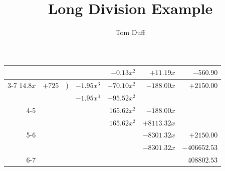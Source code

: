 \documentclass{article}
\title{Long Division Example}
\author{Tom Duff}
\theoremstyle{definition}
\begin{document}
\maketitle

\setlength{\tabcolsep}{0pt}
\begin{center} \begin{tabular}{rrrrrrr}
         &        &   &            &   $-0.13x^2$ &   $+11.19x$ &    $-560.90$ \\
                    \cline{3-7}
 $14.8x$ & $+725$ & ) & $-1.95x^3$ &  $+70.10x^2$ &  $-188.00x$ &   $+2150.00$ \\
         &        &   & $-1.95x^3$ &  $-95.52x^2$ &             &              \\
                        \cline{4-5}
         &        &   &            &  $165.62x^2$ &  $-188.00x$ &              \\
         &        &   &            &  $165.62x^2$ & $+8113.32x$ &              \\
                                      \cline{5-6}
         &        &   &            &              & $-8301.32x$ &   $+2150.00$ \\
         &        &   &            &              & $-8301.32x$ & $-406652.53$ \\
                                                    \cline{6-7}
         &        &   &            &              &             &  $408802.53$
\end{tabular} \end{center}
\end{document}
